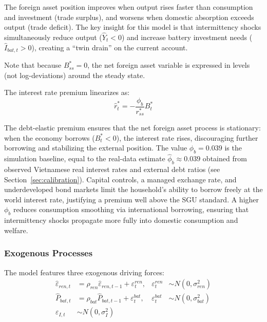 \documentclass[12pt, a4paper]{article}
\begin{document}
	The foreign asset position improves when output rises faster than consumption and investment (trade surplus), and worsens when domestic absorption exceeds output (trade deficit). The key insight for this model is that intermittency shocks simultaneously reduce output ($\hat{Y}_t < 0$) and increase battery investment needs ($\hat{I}_{bat,t} > 0$), creating a ``twin drain'' on the current account.
	
	Note that because $B^*_{ss} = 0$, the net foreign asset variable is expressed in levels (not log-deviations) around the steady state.
	
	The interest rate premium linearizes as:
	\begin{equation}
		\hat{r}^*_t = -\frac{\phi_b}{r^*_{ss}} B^*_t
		\label{eq:premium_lin}
	\end{equation}
	
	The debt-elastic premium ensures that the net foreign asset process is stationary: when the economy borrows ($B^*_t < 0$), the interest rate rises, discouraging further borrowing and stabilizing the external position. The value $\phi_b = 0.039$ is the simulation baseline, equal to the real-data estimate $\hat{\phi}_b \approx 0.039$ obtained from observed Vietnamese real interest rates and external debt ratios (see Section~\ref{sec:calibration}). Capital controls, a managed exchange rate, and underdeveloped bond markets limit the household's ability to borrow freely at the world interest rate, justifying a premium well above the SGU standard. A higher $\phi_b$ reduces consumption smoothing via international borrowing, ensuring that intermittency shocks propagate more fully into domestic consumption and welfare.
	
	\subsubsection{Exogenous Processes}
	
	The model features three exogenous driving forces:
	\begin{align}
		\hat{\varepsilon}_{ren,t} &= \rho_{ren} \hat{\varepsilon}_{ren,t-1} + \varepsilon^{ren}_t, & \varepsilon^{ren}_t &\sim N(0, \sigma^2_{ren}) \label{eq:shock_ren} \\
		\hat{P}_{bat,t} &= \rho_{bat} \hat{P}_{bat,t-1} + \varepsilon^{bat}_t, & \varepsilon^{bat}_t &\sim N(0, \sigma^2_{bat}) \label{eq:shock_bat} \\
		\varepsilon_{I,t} &\sim N(0, \sigma^2_I) \label{eq:shock_gov}
	\end{align}
	
\end{document}
